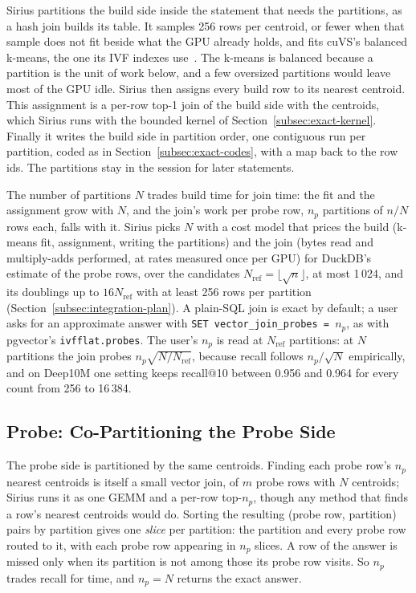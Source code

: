 Sirius partitions the build side inside the statement that needs the partitions, as a hash join builds its table.
It samples 256 rows per centroid, or fewer when that sample does not fit beside what the GPU already holds, and fits cuVS's balanced k-means, the one its IVF indexes use~\cite{NvidiaCuVS26}.
The k-means is balanced because a partition is the unit of work below, and a few oversized partitions would leave most of the GPU idle.
Sirius then assigns every build row to its nearest centroid.
This assignment is a per-row top-1 join of the build side with the centroids, which Sirius runs with the bounded kernel of Section~\ref{subsec:exact-kernel}.
Finally it writes the build side in partition order, one contiguous run per partition, coded as in Section~\ref{subsec:exact-codes}, with a map back to the row ids.
The partitions stay in the session for later statements.

The number of partitions $N$ trades build time for join time: the fit and the assignment grow with $N$, and the join's work per probe row, $n_p$ partitions of $n/N$ rows each, falls with it.
Sirius picks $N$ with a cost model that prices the build (k-means fit, assignment, writing the partitions) and the join (bytes read and multiply-adds performed, at rates measured once per GPU) for DuckDB's estimate of the probe rows, over the candidates $N_{\mathrm{ref}}=\lfloor\sqrt{n}\rfloor$, at most 1\,024, and its doublings up to $16N_{\mathrm{ref}}$ with at least 256 rows per partition (Section~\ref{subsec:integration-plan}).
A plain-SQL join is exact by default; a user asks for an approximate answer with \texttt{SET vector\_join\_probes = }$n_p$, as with pgvector's \texttt{ivfflat.probes}.
The user's $n_p$ is read at $N_{\mathrm{ref}}$ partitions: at $N$ partitions the join probes $n_p\sqrt{N/N_{\mathrm{ref}}}$, because recall follows $n_p/\sqrt{N}$ empirically, and on Deep10M one setting keeps recall@10 between 0.956 and 0.964 for every count from 256 to 16\,384.

\subsection{Probe: Co-Partitioning the Probe Side}\label{subsec:approx-probe}

The probe side is partitioned by the same centroids.
Finding each probe row's $n_p$ nearest centroids is itself a small vector join, of $m$ probe rows with $N$ centroids; Sirius runs it as one GEMM and a per-row top-$n_p$, though any method that finds a row's nearest centroids would do.
Sorting the resulting (probe row, partition) pairs by partition gives one \emph{slice} per partition: the partition and every probe row routed to it, with each probe row appearing in $n_p$ slices.
A row of the answer is missed only when its partition is not among those its probe row visits.
So $n_p$ trades recall for time, and $n_p=N$ returns the exact answer.

